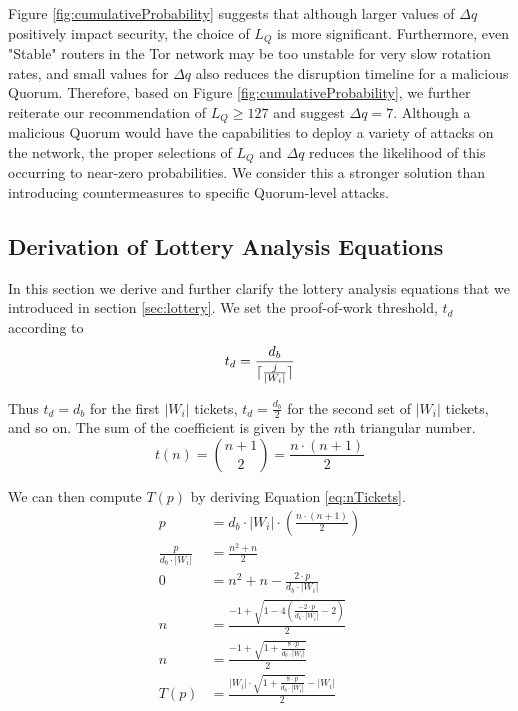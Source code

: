 \documentclass[USenglish,oneside,twocolumn]{article}
\DeclarePairedDelimiter{\ceil}{\lceil}{\rceil}
\newcommand*\nWinners{\left\vert{W_{i}}\right\vert}
\begin{document}
Figure \ref{fig:cumulativeProbability} suggests that although larger values of $ \Delta q $ positively impact security, the choice of $ L_{Q} $ is more significant. Furthermore, even "Stable" routers in the Tor network may be too unstable for very slow rotation rates, and small values for $ \Delta q $ also reduces the disruption timeline for a malicious Quorum. Therefore, based on Figure \ref{fig:cumulativeProbability}, we further reiterate our recommendation of $ L_{Q} \geq 127 $ and suggest $ \Delta q = 7 $. Although a malicious Quorum would have the capabilities to deploy a variety of attacks on the network, the proper selections of $ L_{Q} $ and $ \Delta q $ reduces the likelihood of this occurring to near-zero probabilities. We consider this a stronger solution than introducing countermeasures to specific Quorum-level attacks.

\subsection{Derivation of Lottery Analysis Equations}

In this section we derive and further clarify the lottery analysis equations that we introduced in section \ref{sec:lottery}. We set the proof-of-work threshold, $ t_{d} $ according to
\[
	t_{d} = \frac{d_{b}}{\ceil{\frac{j}{\nWinners}}}
\]

Thus $ t_{d} = d_{b} $ for the first $ \nWinners $ tickets, $ t_{d} = \frac{d_{b}}{2} $ for the second set of $ \nWinners $ tickets, and so on. The sum of the coefficient is given by the $ n $th triangular number.
\[
	t(n) = \binom{n + 1}{2} = \frac{n \cdot (n + 1)}{2}
\]

We can then compute $ T(p) $ by deriving Equation \ref{eq:nTickets}.
\begin{align*}
	p &= d_{b} \cdot \nWinners \cdot (\frac{n \cdot  (n+1)}{2}) \\
	\frac{p}{d_{b} \cdot \nWinners} &= \frac{n^{2} + n}{2} \\
	0 &= n^{2} + n - \frac{2 \cdot p}{d_{b} \cdot \nWinners} \\
	n &=  \frac{-1 + \sqrt{1 - 4(\frac{-2 \cdot p}{d_{b} \cdot \nWinners} - 2)}}{2} \\
	n &= \frac{-1+ \sqrt{1 + \frac{8 \cdot p}{d_{b} \cdot \nWinners}}}{2} \\
	T(p) &= \frac{\nWinners \cdot \sqrt{1 + \frac{8 \cdot p}{d_{b} \cdot \nWinners}} - \nWinners}{2}
\end{align*}
\end{document}
